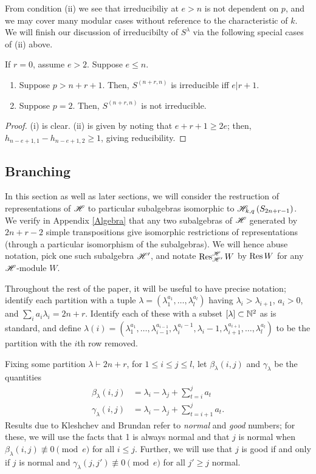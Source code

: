 \documentclass{amsart}
\begin{document}
  From condition (ii) we see that irreducibiliy at $e > n$ is not dependent on $p$, and we may cover many modular cases without reference to the characteristic of $k$.
  We will finish our discussion of irreducibilty of $S^\lambda$ via the following special cases of (ii) above.
  \begin{corollary}
    If $r = 0$, assume $e > 2$.
    Suppose $e \leq n$.
    \begin{enumerate}[label={(\roman*)}]
      \item Suppose $p > n + r + 1$. Then, $S^{(n + r,n)}$ is irreducible iff $e | r + 1$.
      \item Suppose $p = 2$. Then, $S^{(n+r,n)}$ is not irreducible.
    \end{enumerate}
  \end{corollary}
  \begin{proof}
    (i) is clear.
    (ii) is given by noting that $e + r + 1 \geq 2e$;
    then, $h_{n-e+1,1} - h_{n-e+1,2} \geq 1$, giving reducibility.
  \end{proof}
  \subsection{Branching}
  In this section as well as later sections, we will consider the restruction of representations of $\mathscr{H}$ to particular subalgebras isomorphic to $\mathscr{H}_{k,q}\left( S_{2n + r - 1} \right)$.
  We verify in Appendix \ref{Algebra} that any two subalgebras of $\mathscr{H}$ generated by $2n + r - 2$ simple transpositions give isomorphic restrictions of representations (through a particular isomorphism of the subalgebras).
  We will hence abuse notation, pick one such subalgebra $\mathscr{H}'$, and notate $\operatorname{Res}_{\mathscr{H}'}^{\mathscr{H}} W$ by $\operatorname{Res} W$ for any $\mathscr{H}$-module $W$.
  

  Throughout the rest of the paper, it will be useful to have precise notation;
  identify each partition with a tuple $\lambda = (\lambda_1^{a_1},\dots,\lambda_l^{a_l})$ having $\lambda_i > \lambda_{i+1}$, $a_i > 0$, and $\sum_i a_i\lambda_i = 2n + r$.
  Identify each of these with a subset $\left[ \lambda \right] \subset \mathbb{N}^2$ as is standard, and define $\lambda(i) = (\lambda_1^{a_1},\dots,\lambda_{i-1}^{a_{i-1}},\lambda_i^{a_i - 1},\lambda_i-1,\lambda_{i+1}^{a_{i+1}},\dots,\lambda_l^{a_l})$ to be the partition with the $i$th row removed.\cite{Kleshchev}
  
  Fixing some partition $\lambda \vdash 2n + r$, for $1 \leq i \leq j \leq l$, let $\beta_\lambda(i,j)$ and $\gamma_\lambda$ be the quantities
  \begin{align*}
    \beta_\lambda(i,j) &= \lambda_i - \lambda_j + \sum_{t = i}^j a_t\\
    \gamma_\lambda(i,j) &= \lambda_i - \lambda_j + \sum_{t = i+1}^j a_t.
  \end{align*}
  Results due to Kleshchev and Brundan refer to \emph{normal} and \emph{good} numbers;
  for these, we will use the facts that 1 is always normal and that $j$ is normal when $\beta_\lambda(i,j) \not\equiv 0 \pmod e$ for all $i \leq j$.
  Further, we will use that $j$ is good if and only if $j$ is normal and $\gamma_\lambda(j,j') \not\equiv 0 \pmod e$ for all $j' \geq j$ normal.\cite{Brundan,Kleshchev}
  
\end{document}
